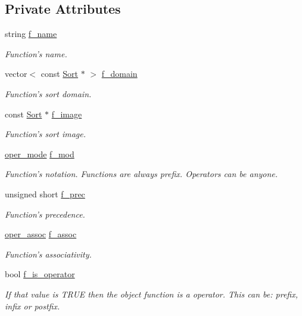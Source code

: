\subsection*{Private Attributes}
\begin{CompactItemize}
\item 
string \hyperlink{classgenevalmag_1_1Function_dab115bdcdc014b30b2b9c9e2da07109}{f\_\-name}
\begin{CompactList}\small\item\em Function's name. \item\end{CompactList}\item 
vector$<$ const \hyperlink{classgenevalmag_1_1Sort}{Sort} $\ast$ $>$ \hyperlink{classgenevalmag_1_1Function_e8e057eeebfabdc524e10e42e54da43c}{f\_\-domain}
\begin{CompactList}\small\item\em Function's sort domain. \item\end{CompactList}\item 
const \hyperlink{classgenevalmag_1_1Sort}{Sort} $\ast$ \hyperlink{classgenevalmag_1_1Function_4abfbb9239231cf2a586935546a585f8}{f\_\-image}
\begin{CompactList}\small\item\em Function's sort image. \item\end{CompactList}\item 
\hyperlink{namespacegenevalmag_8e412eca3897f0532c6f1997af777ba4}{oper\_\-mode} \hyperlink{classgenevalmag_1_1Function_63645db8078f5c96b2c24d4873ee0fcd}{f\_\-mod}
\begin{CompactList}\small\item\em Function's notation. Functions are always prefix. Operators can be anyone. \item\end{CompactList}\item 
unsigned short \hyperlink{classgenevalmag_1_1Function_24cd8c438fe7af6c23d91a83587acce9}{f\_\-prec}
\begin{CompactList}\small\item\em Function's precedence. \item\end{CompactList}\item 
\hyperlink{namespacegenevalmag_ed96782841eb4586b9e32ce72721d64b}{oper\_\-assoc} \hyperlink{classgenevalmag_1_1Function_20f4e51ba6a747b7422406b6af6b40a1}{f\_\-assoc}
\begin{CompactList}\small\item\em Function's associativity. \item\end{CompactList}\item 
bool \hyperlink{classgenevalmag_1_1Function_681af241838253c6b001e92541be7b4c}{f\_\-is\_\-operator}
\begin{CompactList}\small\item\em If that value is TRUE then the object function is a operator. This can be: prefix, infix or postfix. \item\end{CompactList}\end{CompactItemize}


